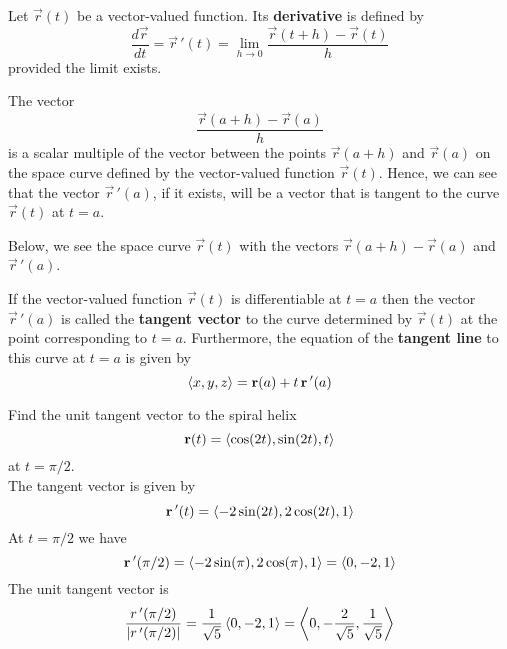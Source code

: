 \documentclass[handout]{ximera}
\begin{document}
\begin{definition}
Let $\vec r(t)$ be a vector-valued function. Its \textbf{derivative} is defined by
\[
\frac{d\vec r}{dt} = \vec r\, '(t) = \lim_{h \to 0} \frac{\vec r(t+h) - \vec r(t)}{h}
\]
provided the limit exists.
\end{definition}

\begin{remark}
The vector 
\[
\frac{\vec r(a+h) - \vec r(a)}{h}
\]
is a scalar multiple of the vector between the points $\vec r(a+h)$ and $\vec r(a)$ on the space 
curve defined by the vector-valued function $\vec r(t)$. 
Hence, we can see that the vector $\vec r\,'(a)$, if it exists, 
will be a vector that is tangent to the curve $\vec r(t)$ at $t = a$. 
\end{remark}
Below, we see the space curve $\vec r(t)$ with the vectors $\vec r(a+h) - \vec r(a)$ and $\vec r\,'(a)$.
\begin{image}
\end{image}


\begin{definition}
If the vector-valued function $\vec r(t)$ is differentiable at $t = a$ then the vector $\vec r\,'(a)$ is called the 
\textbf{tangent vector} to the curve determined by $\vec r(t)$ at the point corresponding to $t = a$. 
Furthermore, the equation of the \textbf{tangent line} to this curve at $ t= a$ is given by
\[
\left\langle x, y, z\right\rangle = \mathbf r(a) + t\,\mathbf r\,'(a)
\]
\end{definition}

\begin{example}[Example 3] 
Find the unit tangent vector to the spiral helix
\[
\mathbf r(t) = \left\langle \cos(2t), \sin(2t), t\right\rangle
\]
at $t = \pi/2$.\\
The tangent vector is given by
\[
\mathbf r\,'(t) = \left\langle -2\sin(2t), 2\cos(2t), 1\right\rangle
\]
At $t = \pi/2$ we have
\[
\mathbf r\,'(\pi/2) = \left\langle -2\sin(\pi), 2\cos(\pi), 1\right\rangle = \left\langle 0, -2, 1\right\rangle
\]
The unit tangent vector is
\[
\frac{r\,'(\pi/2)}{|r\,'(\pi/2)|} = \frac{1}{\sqrt 5}\left\langle 0, -2, 1\right\rangle = \left\langle 0, -\frac{2}{\sqrt 5}, \frac{1}{\sqrt 5}\right\rangle
\]

\end{example}
\end{document}
